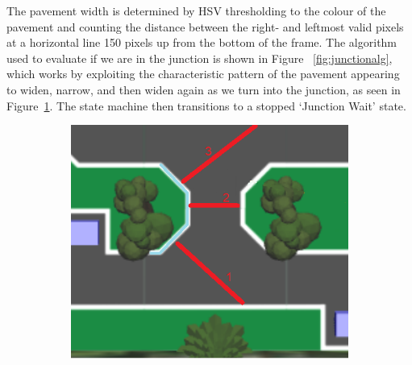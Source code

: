 \documentclass[titlepage, twocolumn]{article}
\begin{document}
            The pavement width is determined by HSV thresholding to the colour of the pavement and counting the distance between the right- and leftmost valid pixels at a horizontal line 150 pixels up from the bottom of the frame. The algorithm used to evaluate if we are in the junction is shown in Figure ~\ref{fig:junctionalg}, which works by exploiting the characteristic pattern of the pavement appearing to widen, narrow, and then widen again as we turn into the junction, as seen in Figure~\ref{fig:charwidth}. The state machine then transitions to a stopped `Junction Wait' state. 

            \begin{figure}
                \begin{center}
                    \begin{subfigure}{0.5\linewidth}
                        \centering\captionsetup{width=.9\linewidth}%
                        \includegraphics[width=0.9\linewidth]{charwidth.png}
                        \label{fig:charwidth}
                      \end{subfigure}%
                      \begin{subfigure}{0.5\linewidth}
                        \centering\captionsetup{width=.9\linewidth}%

\end{subfigure}
\end{center}
\end{figure}
\end{document}
